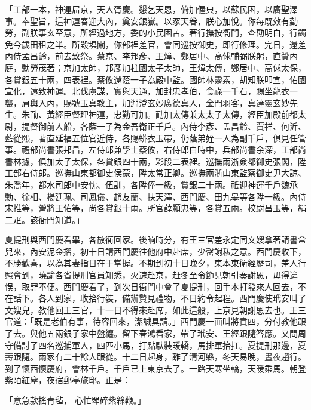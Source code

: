 「工部一本，神運屇京，天人胥慶。懇乞天恩，俯加偓典，以蘇民困，以廣聖澤事。奉聖旨，這神運春迎大內，奠安銀嶽。以豕天眷，朕心加悅。你每既效有勤勞，副朕事玄至意，所經過地方，委的小民困苦。著行撫按衙門，查勘明白，行蠲免今歲田租之半。所毀埧閘，你部裡差官，會同巡按御史，即行修理。完日，還差內侍孟昌齡，前去致祭。蔡京、李邦彥、王煒、鄭居中、高俅輔弼朕躬，直贊內庭，勳勞茂著；京加太師，邦彥加柱國太子太師，王煒太傳，鄭居中、高俅太保，各賞銀五十兩，四表裡。蔡攸還蔭一子為殿中監。國師林靈素，胡知朕叩宣，佑國宣化，遠致神運。北伐虜謀，實與天通，加封忠孝伯，食祿一千石，賜坐龍衣一襲，肩輿入內，賜號玉真教主，加淵澄玄妙廣德真人，金門羽客，真達靈玄妙先生。朱勔、黃經臣督理神運，忠勤可加。勔加太傳兼太太子太傳，經臣加殿前都太尉，提督御前人船，各蔭一子為金吾衛正千戶。內侍李彥、孟昌齡、賈祥、何沂、藍從熙，著直延福五位官近侍，各賜蟒衣玉帶，仍蔭弟姪一人為副千戶，俱見任管事。禮部尚書張邦昌，左侍郎兼學士蔡攸，右侍郎白時中，兵部尚書余深，工部尚書林攄，俱加太子太保，各賞銀四十兩，彩段二表裡。巡撫兩浙僉都御史張閣，陞工部右侍郎。巡撫山東都御史侯蒙，陞太常正卿。巡撫兩浙山東監察御史尹大諒、朱喬年，都水司郎中安忱、伍訓，各陞俸一級，賞銀二十兩。祇迎神運千戶魏承勳、徐相、楊廷珮、司鳳儀、趙友蘭、扶天澤、西門慶、田九皋等各陞一級。內侍宋推等，營將王佑等，尚各賞銀十兩。所官薛顥忠等，各賞五兩。校尉昌玉等，絹二疋。該衙門知道。」

夏提刑與西門慶看畢，各散衙回家。後晌時分，有王三官差永定同文嫂拿著請書盒兒來，內安泥金摺，初十日請西門慶往他府中赴席，少罄謝私之意。西門慶收下，不勝歡喜，以為其妻指日在于掌握。不期到初十日晚夕，東本東衛經歷司，差人行照會到，曉諭各省提刑官員知悉，火速赴京，赶冬至令節見朝引奏謝恩，毋得違悮，取罪不便。西門慶看了，到次日衙門中會了夏提刑，回手本打發來人回去，不在話下。各人到家，收拾行裝，備辦贄見禮物，不日約令起程。西門慶使玳安叫了文嫂兒，教他回王三官，十一日不得來赴席，如此這般，上京見朝謝恩去也。王三官道：「既是老伯有事，待容回來，潔誠具請。」西門慶一面叫將賁四，分付教他跟了去。與他五兩銀子家中盤纏。留下春鴻看家，帶了玳安、王經跟隨答應。又問周守備討了四名巡捕軍人，四匹小馬，打點馱裝暖轎，馬排軍抬扛。夏提刑那邊，夏壽跟隨。兩家有二十餘人跟從。十二日起身，離了清河縣，冬天易晚，晝夜趲行。到了懷西懷慶府，會林千戶。千戶已上東京去了。一路天寒坐轎，天暖乘馬。朝登紫陌紅塵，夜宿郵亭旅邸。正是：

「意急款搖青毡，  心忙斝碎紫絲鞭。」

